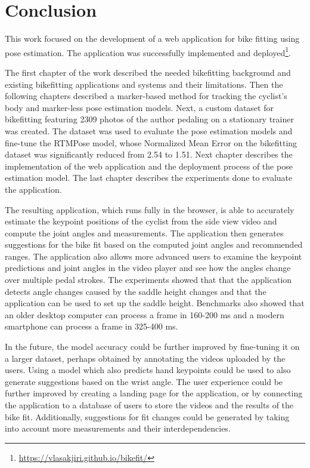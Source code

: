 
\chapter{Conclusion}
\label{conclusion}

This work focused on the development of a web application for bike fitting using pose estimation. The application was successfully implemented and deployed\footnote{\url{https://vlasakjiri.github.io/bikefit/}}.

The first chapter of the work described the needed bikefitting background and existing bikefitting applications and systems and their limitations. Then the following chapters described a marker-based method for tracking the cyclist's body and marker-less pose estimation models. Next, a custom dataset for bikefitting featuring 2309 photos of the author pedaling on a stationary trainer was created. The dataset was used to evaluate the pose estimation models and fine-tune the RTMPose model, whose Normalized Mean Error on the bikefitting dataset was significantly reduced from 2.54 to 1.51. Next chapter describes the implementation of the web application and the deployment process of the pose estimation model. The last chapter describes the experiments done to evaluate the application.

The resulting application, which runs fully in the browser, is able to accurately estimate the keypoint positions of the cyclist from the side view video and compute the joint angles and measurements. The application then generates suggestions for the bike fit based on the computed joint angles and recommended ranges. The application also allows more advanced users to examine the keypoint predictions and joint angles in the video player and see how the angles change over multiple pedal strokes. The experiments showed that that the application detects angle changes caused by the saddle height changes and that the application can be used to set up the saddle height. Benchmarks also showed that an older desktop computer can process a frame in 160-200 ms and a modern smartphone can process a frame in 325-400 ms.

In the future, the model accuracy could be further improved by fine-tuning it on a larger dataset, perhaps obtained by annotating the videos uploaded by the users. Using a model which also predicts hand keypoints could be used to also generate suggestions based on the wrist angle. The user experience could be further improved by creating a landing page for the application, or by connecting the application to a database of users to store the videos and the results of the bike fit. Additionally, suggestions for fit changes could be generated by taking into account more measurements and their interdependencies.



% 